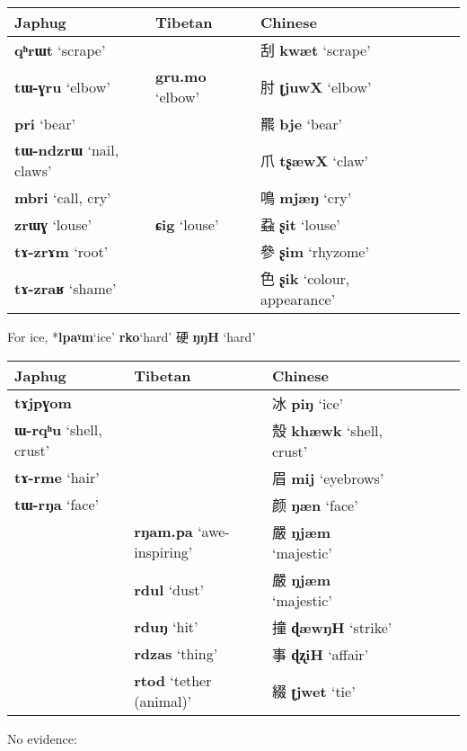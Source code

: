 \documentclass[oneside,a4paper,11pt]{article}
\newcommand{\ipa}[1]{{\phon\mbox{\textbf{#1}}}}
\newcommand{\zh}[1]{{\cn #1}}
\newcommand{\ch}[3]{\zh{#1} \ipa{#2} `#3'}
\begin{document}
\begin{tabular}{llllll}
\toprule
Japhug & Tibetan & Chinese \\
\midrule
\ipa{qʰrɯt} `scrape' &&\ch{刮}{kwæt}{scrape} \\
\ipa{tɯ-ɣru} `elbow' &\ipa{gru.mo} `elbow' &\ch{肘}{ʈjuwX}{elbow}\\
\ipa{pri} `bear'&& \ch{羆}{bje}{bear} \\
\ipa{tɯ-ndzrɯ} `nail, claws' &&\ch{爪}{tʂæwX}{claw}\\
\ipa{mbri} `call, cry'&& \ch{鳴}{mjæŋ}{cry}\\
\ipa{zrɯɣ} `louse'&\ipa{ɕig} `louse'& \ch{蝨}{ʂit}{louse} \\
\ipa{tɤ-zrɤm} `root' &&\ch{參}{ʂim}{rhyzome}\\
\ipa{tɤ-zraʁ}  `shame' && \ch{色}{ʂik}{colour, appearance}\\
\bottomrule
\end{tabular}



For ice, *\ipa{lpaˠm}`ice'
\ipa{rko}`hard' \ch{硬}{ŋŋH}{hard}
\begin{tabular}{lllllll}
\toprule
Japhug & Tibetan & Chinese \\
\midrule
\ipa{tɤjpɣom}  &&\ch{冰}{piŋ}{ice} \\
\ipa{ɯ-rqʰu} `shell, crust' &&\ch{殼}{khæwk}{shell, crust}\\
\ipa{tɤ-rme} `hair' &&\ch{眉}{mij}{eyebrows}\\
\ipa{tɯ-rŋa} `face'&& \ch{颜}{ŋæn}{face} \\
\midrule
&\ipa{rŋam.pa} `awe-inspiring'& \ch{嚴}{ŋjæm}{majestic}\\
&\ipa{rdul} `dust'& \ch{嚴}{ŋjæm}{majestic}\\
&\ipa{rduŋ} `hit'& \ch{撞}{ɖæwŋH}{strike}\\
&\ipa{rdzas} `thing'& \ch{事}{ɖʐiH}{affair}\\
&\ipa{rtod} `tether (animal)'& \ch{綴}{ʈjwet}{tie}\\
\bottomrule
\end{tabular}


No evidence:
\end{document}
